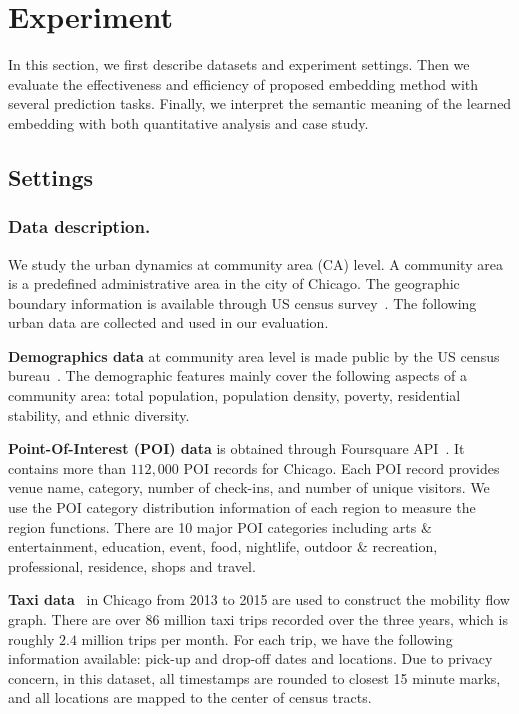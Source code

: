 \section{Experiment}
\label{ch3-sec:experiments}

\newcommand{\dgef}{$DGE_{flow}$\xspace}
\newcommand{\dges}{$DGE_{spatial}$\xspace}
\newcommand{\hdge}{$HDGE$\xspace}

In this section, we first describe datasets and experiment settings. Then we evaluate the effectiveness and efficiency of proposed embedding method with several prediction tasks. Finally, we interpret the semantic meaning of the learned embedding with both quantitative analysis and case study.


\subsection{Settings}

\subsubsection{Data description.} We study the urban dynamics at community area (CA) level. A community area is a predefined administrative area in the city of Chicago. The geographic boundary information is available through US census survey~\cite{data-census}. The following urban data are collected and used in our evaluation.

\textbf{Demographics data} at community area level is made public by the US census bureau~\cite{data-census}. The demographic features mainly cover the following aspects of a community area: total population, population density, poverty, residential stability, and ethnic diversity.

\textbf{Point-Of-Interest (POI) data} is obtained through Foursquare API~\cite{data-poi}. It contains more than $112,000$ POI records for Chicago. Each POI record provides venue name, category, number of check-ins, and number of unique visitors. We use the POI category distribution information of each region to measure the region functions. There are 10 major POI categories including arts \& entertainment, education, event, food, nightlife, outdoor \& recreation, professional, residence, shops and travel.

\textbf{Taxi data}~\cite{data-taxi} in Chicago from 2013 to 2015 are used to construct the mobility flow graph. There are over $86$ million taxi trips recorded over the three years, which is roughly $2.4$ million trips per month. For each trip, we have the following information available: pick-up and drop-off dates and locations. Due to privacy concern, in this dataset, all timestamps are rounded to closest 15 minute marks, and all locations are mapped to the center of census tracts.

